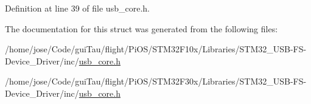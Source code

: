 Definition at line 39 of file usb\-\_\-core.\-h.



The documentation for this struct was generated from the following files\-:\begin{DoxyCompactItemize}
\item 
/home/jose/\-Code/gui\-Tau/flight/\-Pi\-O\-S/\-S\-T\-M32\-F10x/\-Libraries/\-S\-T\-M32\-\_\-\-U\-S\-B-\/\-F\-S-\/\-Device\-\_\-\-Driver/inc/\hyperlink{_s_t_m32_f10x_2_libraries_2_s_t_m32___u_s_b-_f_s-_device___driver_2inc_2usb__core_8h}{usb\-\_\-core.\-h}\item 
/home/jose/\-Code/gui\-Tau/flight/\-Pi\-O\-S/\-S\-T\-M32\-F30x/\-Libraries/\-S\-T\-M32\-\_\-\-U\-S\-B-\/\-F\-S-\/\-Device\-\_\-\-Driver/inc/\hyperlink{_s_t_m32_f30x_2_libraries_2_s_t_m32___u_s_b-_f_s-_device___driver_2inc_2usb__core_8h}{usb\-\_\-core.\-h}\end{DoxyCompactItemize}
